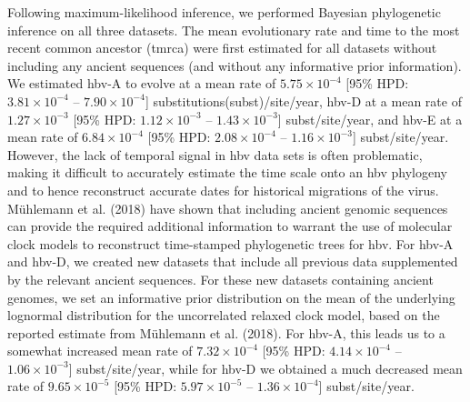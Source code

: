 

Following maximum-likelihood inference, we performed Bayesian phylogenetic inference on all three datasets.
The mean evolutionary rate and time to the most recent common ancestor (\gls{tmrca}) were first estimated for all datasets without including any ancient sequences (and without any informative prior information).
We estimated \gls{hbv}-A to evolve at a mean rate of $5.75 \times 10^{-4}$ [95\% HPD: $3.81 \times 10^{-4}$ -- $7.90 \times 10^{-4}$] substitutions(subst)/site/year, \gls{hbv}-D at a mean rate of $1.27 \times 10^{-3}$ [95\% HPD: $1.12 \times 10^{-3}$ -- $1.43 \times 10^{-3}$] subst/site/year, and \gls{hbv}-E at a mean rate of $6.84 \times 10^{-4}$ [95\% HPD: $2.08 \times 10^{-4}$ -- $1.16 \times 10^{-3}$] subst/site/year.
However, the lack of temporal signal in \gls{hbv} data sets is often problematic, making it difficult to accurately estimate the time scale onto an \gls{hbv} phylogeny and to hence reconstruct accurate dates for historical migrations of the virus.
M\"uhlemann et al. (2018) have shown that including ancient genomic sequences can provide the required additional information to warrant the use of molecular clock models to reconstruct time-stamped phylogenetic trees for \gls{hbv}.
For \gls{hbv}-A and \gls{hbv}-D, we created new datasets that include all previous data supplemented by the relevant ancient sequences.
For these new datasets containing ancient genomes, we set an informative prior distribution on the mean of the underlying lognormal distribution for the uncorrelated relaxed clock model, based on the reported estimate from M\"uhlemann et al. (2018).
For \gls{hbv}-A, this leads us to a somewhat increased mean rate of $7.32 \times 10^{-4}$ [95\% HPD: $4.14 \times 10^{-4}$ -- $1.06 \times 10^{-3}$] subst/site/year, while for \gls{hbv}-D we obtained a much decreased mean rate of $9.65 \times 10^{-5}$ [95\% HPD: $5.97 \times 10^{-5}$ -- $1.36 \times 10^{-4}$] subst/site/year.

